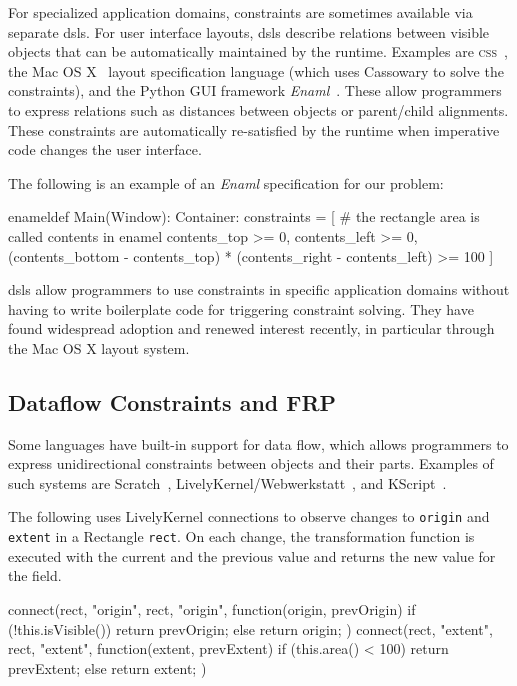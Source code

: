 For specialized application domains, constraints are sometimes
available via separate \acp{dsl}. For user interface layouts, \acp{dsl}
describe relations between visible objects that can be automatically
maintained by the runtime.  Examples are
\textsc{css}~\cite{lie-css-book}, the Mac OS
X~\cite{AppleCocoaAutoLayout} layout specification language (which
uses Cassowary to solve the constraints), and the Python GUI framework
\emph{Enaml}~\cite{Enaml}. These allow programmers to express
relations such as distances between objects or parent/child
alignments. These constraints are automatically re-satisfied by the
runtime when imperative code changes the user interface.

The following is an example of an \emph{Enaml} specification for our
problem:
\begin{code}[language=python]
enameldef Main(Window):
    Container:
        constraints = [
            # the rectangle area is called contents in enamel
            contents_top >= 0, contents_left >= 0,
            (contents_bottom - contents_top) *
              (contents_right - contents_left) >= 100
        ]
\end{code}

\acp{dsl} allow programmers to use constraints in specific application
domains without having to write boilerplate code for triggering
constraint solving. They have found widespread adoption and renewed
interest recently, in particular through the Mac OS X layout system.

\subsection{Dataflow Constraints and FRP}

Some languages have built-in support for data flow, which allows
programmers to express unidirectional constraints between objects and
their parts. Examples of such systems are
Scratch~\cite{resnick2009scratch},
LivelyKernel/Webwerkstatt~\cite{lincke2012lively}, and
KScript~\cite{ohshima2013onward}.

The following uses LivelyKernel connections to observe changes to
\texttt{origin} and \texttt{extent} in a Rectangle \texttt{rect}.  On
each change, the transformation function is executed with the current
and the previous value and returns the new value for the field.
\begin{code}[language=java]
connect(rect, "origin", rect, "origin",
        function(origin, prevOrigin) {
            if (!this.isVisible()) return prevOrigin;
            else return origin;
        })
connect(rect, "extent", rect, "extent",
        function(extent, prevExtent) {
            if (this.area() < 100) return prevExtent;
            else return extent;
        })
\end{code}

